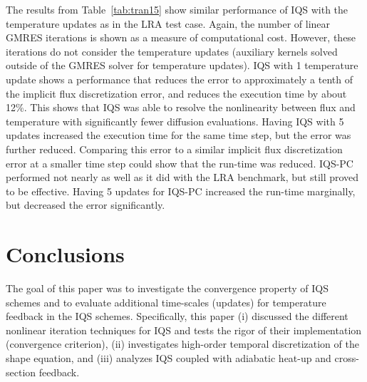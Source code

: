 \documentclass{elsarticle}
\newcommand{\tbl}[1]{Table~\ref{#1}}                     %
\newcommand{\iqspc}{IQS-PC\xspace}
\begin{document}
The results from \tbl{tab:tran15} show similar performance of IQS with the temperature updates as in the LRA
test case. Again, the number of linear GMRES iterations is shown as a measure of computational cost. However, these iterations do not consider the temperature updates (auxiliary kernels solved outside of the GMRES solver for temperature updates). IQS with 1 temperature update shows a performance that reduces the error to approximately a tenth of the implicit flux discretization error, and reduces the execution time by about 12\%.  This shows that IQS was able to resolve the nonlinearity between flux and temperature with significantly fewer diffusion evaluations.  Having IQS with 5 updates increased the execution time for the same time step, but the error was further reduced.  Comparing this error to a similar implicit flux discretization error at a smaller time step could show that the run-time was reduced. \iqspc performed not nearly as well as it did with the LRA benchmark, but still proved to be effective.  Having 5 updates for \iqspc increased the run-time marginally, but decreased the error significantly.


\section{Conclusions}

The goal of this paper was to investigate the convergence property of IQS schemes and to evaluate
additional time-scales (updates) for temperature feedback in the IQS schemes.  Specifically, this paper (i) discussed the different nonlinear iteration techniques for IQS and tests the rigor of their implementation (convergence criterion), (ii) investigates high-order temporal discretization of the shape equation, and (iii) analyzes IQS coupled with adiabatic heat-up and cross-section feedback.
\end{document}
